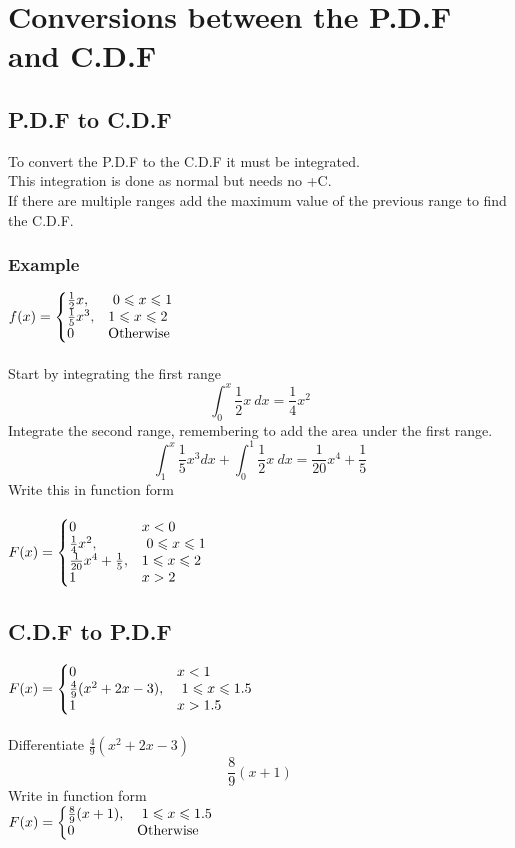 \documentclass{article}[18pt]
\begin{document}
\section{Conversions between the P.D.F and C.D.F}
\subsection{P.D.F to C.D.F}
To convert the P.D.F to the C.D.F it must be integrated.\\
This integration is done as normal but needs no +C.\\
If there are multiple ranges add the maximum value of the previous range to find the C.D.F.
\subsubsection{Example}
{\renewcommand{\arraystretch}{1.5}
$
  f(x)=\left\{
  \begin{array}{@{}ll@{}}
    \frac{1}{2}x, & \ 0\leqslant x\leqslant1\\
    \frac{1}{5}x^3, &  1\leqslant x \leqslant 2\\
    0 & \textrm{Otherwise}
  \end{array}\right.
$}\\
\\
Start by integrating the first range
$$\int_0^x \frac{1}{2}x \ dx=\frac{1}{4}x^2$$
Integrate the second range, remembering to add the area under the first range.
$$\int_1^x \frac{1}{5}x^3 dx+\int_0^1\frac{1}{2}x \ dx=\frac{1}{20}x^4+\frac{1}{5}$$
Write this in function form\\
\\
{\renewcommand{\arraystretch}{1.5}
$
  F(x)=\left\{
  \begin{array}{@{}ll@{}}
  0 & x<0\\
    \frac{1}{4}x^2, & \ 0\leqslant x\leqslant1\\
    \frac{1}{20}x^4+\frac{1}{5}, &  1\leqslant x \leqslant 2\\
    1 & x>2
  \end{array}\right.
$}\\
\subsection{C.D.F to P.D.F}
{\renewcommand{\arraystretch}{1.5}
$
  F(x)=\left\{
  \begin{array}{@{}ll@{}}
  0 & x<1\\
    \frac{4}{9}(x^2+2x-3), & \ 1\leqslant x\leqslant1.5\\
    1 & x>1.5\\
  \end{array}\right.
$}\\
\\
Differentiate $\frac{4}{9}(x^2+2x-3)$
$$\frac{8}{9}(x+1)$$
Write in function form\\
{\renewcommand{\arraystretch}{1.5}
$
  F(x)=\left\{
  \begin{array}{@{}ll@{}}
    \frac{8}{9}(x+1), & \ 1\leqslant x\leqslant1.5\\
    0 & \textrm{Otherwise}\\
  \end{array}\right.
$}\\
\newpage
\end{document}
